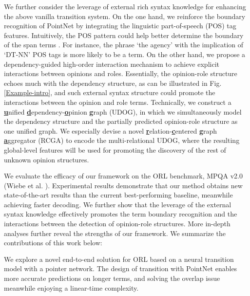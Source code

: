 \documentclass[letterpaper]{article} \usepackage{aaai22}  \usepackage{times}  \usepackage{helvet}  \usepackage{courier}  \usepackage[hyphens]{url}  \usepackage{graphicx} \urlstyle{rm} \def\UrlFont{\rm}  \usepackage{natbib}  \usepackage{caption} \DeclareCaptionStyle{ruled}{labelfont=normalfont,labelsep=colon,strut=off} \frenchspacing  \setlength{\pdfpagewidth}{8.5in}  \setlength{\pdfpageheight}{11in}  \usepackage{algorithm}
\begin{document}
We further consider the leverage of external rich syntax knowledge for enhancing the above vanilla transition system.
On the one hand, we reinforce the boundary recognition of PointNet by integrating the linguistic part-of-speech (POS) tag features.
Intuitively, the POS pattern could help better determine the boundary of the span terms \cite{lin-etal-2018-multi-lingual}.
For instance, the phrase `the agency' with the implication of `DT-NN' POS tags is more likely to be a term.
On the other hand, we propose a dependency-guided high-order interaction mechanism to achieve explicit interactions between opinions and roles.
Essentially, the opinion-role structure echoes much with the dependency structure, as can be illustrated in Fig. \ref{Example-intro}, and such external syntax structure could promote the interactions between the opinion and role terms.
Technically, we construct a \underline{\bf u}nified \underline{\bf d}ependency-\underline{\bf o}pinion \underline{\bf g}raph (UDOG), in which we simultaneously model the dependency structure and the partially predicted opinion-role structure as one unified graph.
We especially devise a novel \underline{\bf r}elation-\underline{\bf c}entered \underline{\bf g}raph \underline{\bf a}ggregator (RCGA) to encode the multi-relational UDOG,
where the resulting global-level features will be used for promoting the discovery of the rest of unknown opinion structures.













We evaluate the efficacy of our framework on the ORL benchmark, MPQA v2.0 (Wiebe et al. \citeyear{WiebeWC05}).
Experimental results demonstrate that our method obtains new state-of-the-art results than the current best-performing baseline, meanwhile achieving faster decoding.
We further show that the leverage of the external syntax knowledge effectively promotes the term boundary recognition and the interactions between the detection of opinion-role structures.
More in-depth analyses further reveal the strengths of our framework.
We summarize the contributions of this work below:




 We explore a novel end-to-end solution for ORL based on a neural transition model with a pointer network.
The design of transition with PointNet enables more accurate predictions on longer terms, and solving the overlap issue meanwhile enjoying a linear-time complexity.
\end{document}

